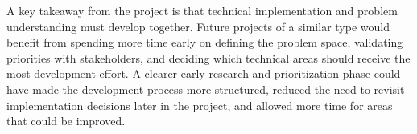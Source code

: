 A key takeaway from the project is that technical implementation and problem understanding must develop together. Future projects of a similar type would benefit from spending more time early on defining the problem space, validating priorities with stakeholders, and deciding which technical areas should receive the most development effort. A clearer early research and prioritization phase could have made the development process more structured, reduced the need to revisit implementation decisions later in the project, and allowed more time for areas that could be improved.